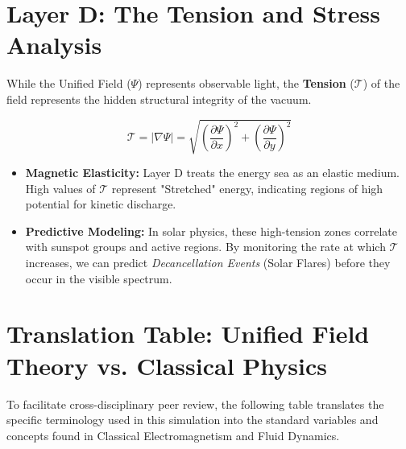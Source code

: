 \documentclass[11pt]{article}
\begin{document}
\section*{Layer D: The Tension and Stress Analysis}

While the Unified Field ($\Psi$) represents observable light, the \textbf{Tension} ($\mathcal{T}$) of the field represents the hidden structural integrity of the vacuum. 

\begin{equation}
    \mathcal{T} = |\nabla \Psi| = \sqrt{\left(\frac{\partial \Psi}{\partial x}\right)^2 + \left(\frac{\partial \Psi}{\partial y}\right)^2}
\end{equation}

\begin{itemize}
    \item \textbf{Magnetic Elasticity:} Layer D treats the energy sea as an elastic medium. High values of $\mathcal{T}$ represent "Stretched" energy, indicating regions of high potential for kinetic discharge.
    \item \textbf{Predictive Modeling:} In solar physics, these high-tension zones correlate with sunspot groups and active regions. By monitoring the rate at which $\mathcal{T}$ increases, we can predict \textit{Decancellation Events} (Solar Flares) before they occur in the visible spectrum.
\end{itemize}

\section*{Translation Table: Unified Field Theory vs. Classical Physics}

To facilitate cross-disciplinary peer review, the following table translates the specific terminology used in this simulation into the standard variables and concepts found in Classical Electromagnetism and Fluid Dynamics.
\end{document}
